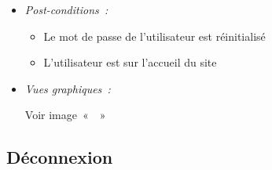 \begin{itemize}
\item \textit{Post-conditions~:}

    \begin{itemize}
        \item Le mot de passe de l'utilisateur est réinitialisé
        \item L'utilisateur est sur l'accueil du site
    \end{itemize}

\item \textit{Vues graphiques~:}

Voir image~«~~»

\end{itemize}

\subsection{Déconnexion}


